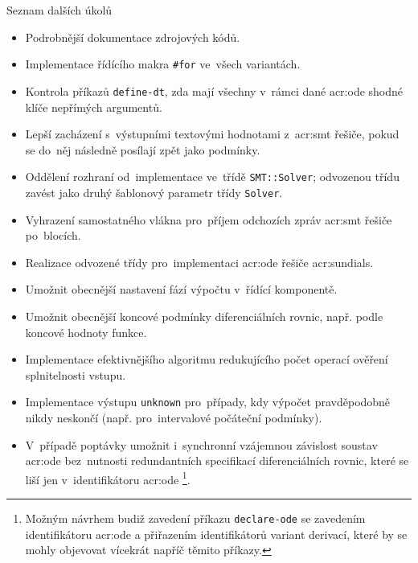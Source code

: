 \documentclass[thesis=M,czech]{FITthesis}[2012/06/26]
\newcommand{\acrlabel}[1]{acr:#1}
\newcommand{\acr}[1]{\acrshort{\acrlabel{#1}}}
\newcommand{\id}[1]{\texttt{#1}}
\begin{document}

\begin{section}{Seznam dalších úkolů}\label{s:impl:todo}
\begin{itemize}
\item Podrobnější dokumentace zdrojových kódů.
\item Implementace řídícího makra \id{\#for} ve~všech variantách.
\item Kontrola příkazů \id{define\--dt}, zda mají všechny
   v~rámci dané \acr{ode} shodné klíče nepřímých argumentů.
\item Lepší zacházení s~výstupními textovými hodnotami z~\acr{smt}
   řešiče, pokud se do~něj následně posílají zpět jako podmínky.
\item Oddělení rozhraní od~implementace ve~třídě \id{SMT::\-Solver};
   odvozenou třídu zavést jako druhý šablonový parametr třídy \id{Solver}.
\item Vyhrazení samostatného vlákna pro~příjem
   odchozích zpráv \acr{smt} řešiče po~blocích.
\item Realizace odvozené třídy pro~implementaci
   \acr{ode} řešiče \acr{sundials}.
\item Umožnit obecnější nastavení fází výpočtu v~řídící komponentě.
\item Umožnit obecnější koncové podmínky diferenciálních rovnic,
   např. podle koncové hodnoty funkce.
\item Implementace efektivnějšího algoritmu
   redukujícího počet operací ověření splnitelnosti vstupu.
\item Implementace výstupu \id{unknown} pro~případy,
   kdy výpočet pravděpodobně nikdy neskončí
   (např. pro~intervalové počáteční podmínky).
\item V~případě poptávky umožnit i~synchronní
   vzájemnou závislost soustav \acr{ode}
   bez~nutnosti redundantních
   specifikací diferenciálních rovnic,
   které se liší jen v~identifikátoru \acr{ode}%
   \footnote{Možným návrhem budiž zavedení příkazu
   \id{declare\--ode} se zavedením identifikátoru \acr{ode}
   a přiřazením identifikátorů variant derivací,
   které by se mohly objevovat vícekrát napříč těmito příkazy.}.
\end{itemize}
\end{section} %


\end{document}
